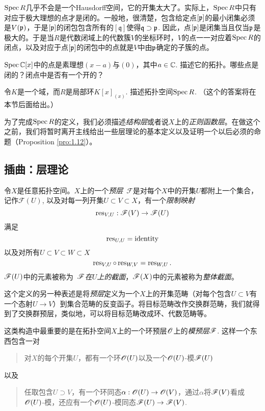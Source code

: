 $\operatorname{Spec} R$几乎不会是一个Hausdorff空间，它的开集太大了。实际上，$\operatorname{Spec} R$中只有对应于极大理想的点才是闭的。一般地，很清楚，包含给定点$[\mathfrak{p}]$的最小闭集必须是$V(\mathfrak{p})$，于是$[\mathfrak{p}]$的闭包包含所有的$[\mathfrak{q}]$使得$\mathfrak{q}\supset\mathfrak{p}$. 因此，点$[\mathfrak{p}]$是闭集当且仅当$\mathfrak{p}$是极大的。于是当$R$是代数闭域上的代数簇$V$的坐标环时，$V$的点一一对应着$\operatorname{Spec} R$的闭点，以及对应于点$[\mathfrak{p}]$的闭包中的点就是$V$中由$\mathfrak{p}$确定的子簇的点。

\begin{exe}
	\begin{compactenum}[(a)]
		\item $\operatorname{Spec} \mathbb{C}[x]$中的点是素理想$(x-a)$与$(0)$，其中$a\in\mathbb{C}$. 描述它的拓扑。哪些点是闭的？闭点中是否有一个开的？
		\item 令$K$是一个域，而$R$是局部环$K[x]_{(x)}$. 描述拓扑空间$\operatorname{Spec} R$. （这个的答案将在本节后面给出。）
	\end{compactenum}
\end{exe}

为了完成$\operatorname{Spec} R$的定义，我们必须描述\textit{结构层}或者说$X$上的\textit{正则函数层}。在做这个之前，我们将暂时离开主线给出一些层理论的基本定义以及证明一个以后必须的命题（Proposition \ref{pro:1.12}）。

\subsection{插曲：层理论}

令$X$是任意拓扑空间。$X$上的一个\textit{预层}~$\mathscr{F}$是对每个$X$中的开集$U$都附上一个集合，记作$\mathscr{F}(U)$, 以及对每一列开集$U\subset V\subset X$，有一个\textit{限制映射}
\[
	\operatorname{res}_{V,U}:\mathscr{F}(V)\to \mathscr{F}(U)
\]
满足
\[
	\operatorname{res}_{U,U}=\mathrm{identity}
\]
以及对所有$U\subset V\subset W\subset X$
\[
	\operatorname{res}_{V,U}\circ \operatorname{res}_{W,V}=\operatorname{res}_{W,U}.
\]
$\mathscr{F}(U)$中的元素被称为~\textit{$\mathscr{F}$在$U$上的截面}，$\mathscr{F}(X)$中的元素被称为\textit{整体截面}。

这个定义的另一种表述是将\textit{预层}定义为一个$X$上的开集范畴（对每个包含$U\subset V$有一个态射$U\to V$）到集合范畴的反变函子。将目标范畴改作交换群范畴，我们就得到了交换群预层，类似地，可以将目标范畴改成环、代数范畴等。

这类构造中最重要的是在拓扑空间$X$上的一个环预层$\mathscr{O}$上的\textit{模预层}$\mathscr{F}$. 这样一个东西包含一对
\begin{quote}
对$X$的每个开集$U$，都有一个环$\mathscr{O}(U)$以及一个$\mathscr{O}(U)$\hyp 模$\mathscr{F}(U)$
\end{quote}
以及
\begin{quote}
任取包含$U\supset V$，有一个环同态$\alpha:\mathscr{O}(U)\to\mathscr{O}(V)$，通过$\alpha$将$\mathscr{F}(V)$看成$\mathscr{O}(U)$\hyp 模，还应有一个$\mathscr{O}(U)$\hyp 模同态$\mathscr{F}(U)\to\mathscr{F}(V)$.
\end{quote}

